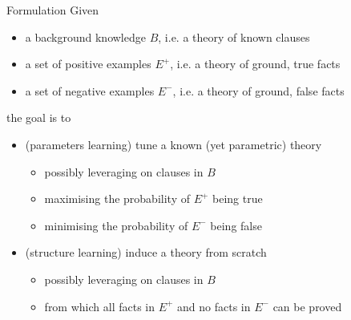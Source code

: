 \documentclass[presentation]{beamer}\mode<presentation>{\usetheme{AMSBolognaFC}}
\begin{document}
\begin{frame}[allowframebreaks]
    \begin{block}{Formulation \cite{DeRaedt2010}}
        Given
        \begin{itemize}
            \item a \alert{background knowledge} $B$, i.e. a theory of known clauses
            \item a set of \alert{positive examples} $E^+$, i.e. a theory of ground, \alert{true} facts
            \item a set of \alert{negative examples} $E^-$, i.e. a theory of ground, \alert{false} facts
        \end{itemize}
        the goal is to 
        \begin{itemize}
            \item \alert{(parameters learning)} tune a \alert{known} (yet \alert{parametric}) theory
            \begin{itemize}
                \item possibly leveraging on clauses in $B$
                \item maximising the probability of $E^+$ being true
                \item minimising the probability of $E^-$ being false
            \end{itemize}
            \item \alert{(structure learning)} induce a theory \alert{from scratch}
            \begin{itemize}
                \item possibly leveraging on clauses in $B$
                \item from which all facts in $E^+$ and no facts in $E^-$ can be proved
            \end{itemize}
        \end{itemize}
    \end{block}
\end{frame}
\end{document}
